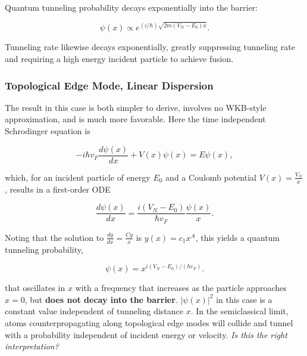 \documentclass[onecolumn,
               superscriptaddress,
               floatfix,
               longbibliography, 
               showkeys,apl]{revtex4-2}
\begin{document}
\begin{appendices}
 Quantum tunneling probability decays exponentially into the barrier:

\begin{equation}
    \boxed{\psi(x) \propto e^{(i/\hbar)\sqrt{2m(V_N-E_0)x}}}.
\end{equation}

Tunneling rate likewise decays exponentially, greatly suppressing tunneling rate and requiring a high energy incident particle to achieve fusion.

\subsubsection{Topological Edge Mode, Linear Dispersion}

The result in this case is both simpler to derive, involves no WKB-style approximation, and is much more favorable. Here the time independent Schrodinger equation is

\begin{equation}
    -i\hbar v_F \frac{d\psi(x)}{dx} + V(x)\psi(x) = E\psi(x),
\end{equation}

which, for an incident particle of energy $E_0$ and a Coulomb potential $V(x)=\frac{V_N}{x}$, results in a first-order ODE

\begin{equation}
    \frac{d\psi(x)}{dx} = \frac{i(V_N-E_0)}{\hbar v_F}\frac{\psi(x)}{x}.
\end{equation}

Noting that the solution to $\frac{dy}{dx}=\frac{Cy}{x}$ is $y(x)=c_1x^{A}$, this yields a quantum tunneling probability,

\begin{equation}
    \boxed{\psi(x) = x^{i(V_N-E_0)/(\hbar v_F)}}.
\end{equation}

that oscillates in $x$ with a frequency that increases as the particle approaches $x=0$, but \textbf{does not decay into the barrier}. $|\psi(x)|^2$ in this case is a constant value independent of tunneling distance $x$. In the semiclassical limit, atoms counterpropagating along topological edge modes will collide and tunnel with a probability independent of incident energy or velocity. \textit{Is this the right interpretation?}

\end{appendices}
\end{document}
